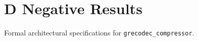 \section{D Negative Results}

Formal architectural specifications for \texttt{grecodec_compressor}.
